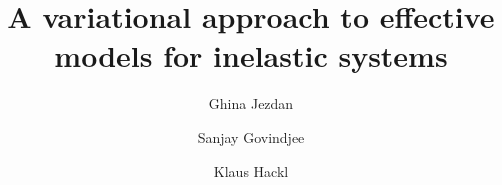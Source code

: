 \documentclass[final,1p,times]{elsarticle}
\begin{document}
\begin{frontmatter}



\title{A variational approach to effective models for inelastic systems}


\author[a]{Ghina Jezdan}
\author[b]{Sanjay Govindjee}
\author[a]{Klaus Hackl}
\address[a]{Institute of Mechanics of Materials, Ruhr-Universit\"{a}t Bochum, D-44780
	Bochum, Germany
}
\address[b]{Structural Engineering, Mechanics, and Materials; Department of Civil and Environmental Engineering, University of California, Berkeley, Berkeley CA 94720-1710, USA
}   


\begin{abstract}
		

\end{abstract}
\end{frontmatter}
\end{document}
